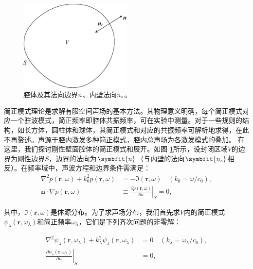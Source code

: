 \begin{figure}[h!]
  \centering
  \includegraphics[width=0.5\textwidth]{images/fig2-4.eps} 
  \caption{腔体及其法向边界$\boldmath{n}$、内壁法向$\boldmath{n_s}$。}
  \label{fig_2_4}
\end{figure}

简正模式理论是求解有限空间声场的基本方法。其物理意义明确，每个简正模式对应一个驻波模式，简正频率即腔体共振频率，可在实验中测量。对于一些规则的结构，如长方体，圆柱体和球体，其简正模式和对应的共振频率可解析地求得，在此不再赘述。声源于腔内激发多种简正模式，腔内总声场为各激发模式的叠加。 在这里，我们探讨刚性壁面腔体的简正模式和展开。如图 \ref{fig_2_4}所示，设封闭区域$V$的边界为刚性边界$S$，边界的法向为$\symbfit{n}$（与内壁的法向$\symbfit{n_s}$相反）。在频率域中，声波方程和边界条件需满足：
\begin{equation}\label{eq2-27}
  \begin{split}
  \nabla^{2}p(\mathbf{r},\omega)+k_{0}^{2}p(\mathbf{r},\omega)&=-\mathfrak{I}(\mathbf{r},\omega)\quad(k_{0}=\omega/c_{0}),\\
  \mathbf{n}\cdot\nabla p(\mathbf{r},\omega)&\equiv\left.\frac{\partial p(\mathbf{r},\omega)}{\partial n}\right|_{S}=0,
  \end{split}
\end{equation}

其中，$\mathfrak{I}(\mathbf{r},\omega)$是体源分布。为了求声场分布，我们首先求$V$内的简正模式$\psi_{\lambda}(\mathbf{r},\omega_{\lambda})$和简正频率$\omega_{\lambda}$，它们是下列齐次问题的非零解：

\begin{equation}\label{eq2-28}
  \begin{split}
  \nabla^{2}\psi_{\lambda}(\mathbf{r},\omega_{\lambda})+k_{\lambda}^{2}\psi_{\lambda}(\mathbf{r},\omega_{\lambda})&=0\quad(k_{\lambda}=\omega_{\lambda}/c_{0}),\\
  \left.\frac{\partial\psi_{\lambda}(\mathbf{r},\omega_{\lambda})}{\partial n}\right|_{S}&=0,
  \end{split}
  \end{equation}

